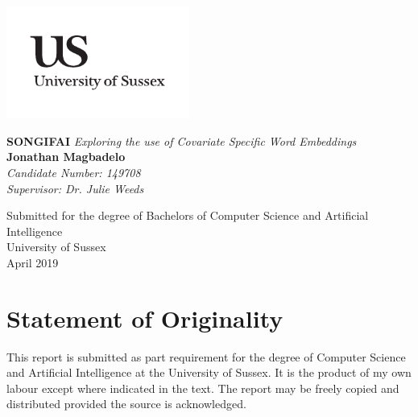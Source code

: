 \documentclass[a4paper,11pt]{report}
\begin{document}




\thispagestyle{empty}
\begin{flushright}
\includegraphics[width=6cm]{uslogo}
\end{flushright}	
\vskip40mm
\begin{center}
\huge\textbf{SONGIFAI}
\vskip2mm
\LARGE\textit{Exploring the use of Covariate Specific Word Embeddings}
\vskip5mm
\Large\textbf{Jonathan Magbadelo} \\
\Large\textit{Candidate Number: 149708} \\
\Large\textit{Supervisor: Dr. Julie Weeds}
\normalsize
\end{center}
\vfill
\begin{flushleft}
\large
Submitted for the degree of Bachelors of Computer Science and Artificial Intelligence  \\
University of Sussex	\\
April 2019
\end{flushleft}		


\chapter*{Statement of Originality}
This report is submitted as part requirement for the degree of Computer Science and Artificial Intelligence at the University of Sussex. It is the product of my own labour except where indicated in the text. The report may be freely copied and distributed provided the source is acknowledged. 
	
\end{document}
